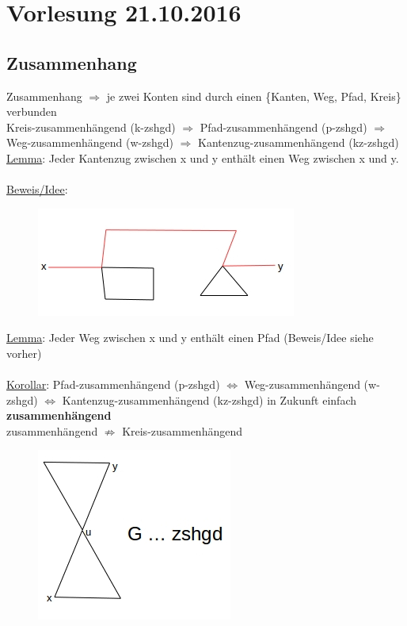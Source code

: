 \section{Vorlesung 21.10.2016}
\subsection{Zusammenhang}
Zusammenhang $\Rightarrow$ je zwei Konten sind durch einen \{Kanten, Weg, Pfad, Kreis\} verbunden\\
Kreis-zusammenhängend (k-zshgd) $\Rightarrow$ Pfad-zusammenhängend (p-zshgd) $\Rightarrow$ Weg-zusammenhängend (w-zshgd) $\Rightarrow$ Kantenzug-zusammenhängend (kz-zshgd)\\

\underline{Lemma}: Jeder Kantenzug zwischen x und y enthält einen Weg zwischen x und y.
\\\\
\underline{Beweis/Idee}:\\
\begin{figure}[htp]
\centering
\includegraphics[scale=1.00]{lectures/161021/pix/pic1.jpg}
\end{figure}

\underline{Lemma}: Jeder Weg zwischen x und y enthält einen Pfad (Beweis/Idee siehe vorher)
\\\\
\underline{Korollar}: Pfad-zusammenhängend (p-zshgd) $\Leftrightarrow$ Weg-zusammenhängend (w-zshgd) $\Leftrightarrow$ Kantenzug-zusammenhängend (kz-zshgd) in Zukunft einfach \textbf{zusammenhängend}\\

zusammenhängend $\nRightarrow$ Kreis-zusammenhängend
\begin{figure}[htp]
\centering
\includegraphics[scale=1.00]{lectures/161021/pix/pic2.jpg}
\end{figure}

